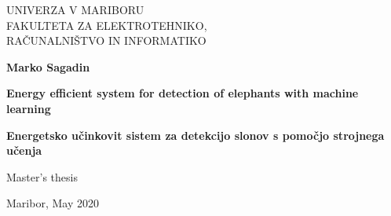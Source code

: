 \begin{titlepage}
    \begin{center}
 
        \fontsize{16}{26}
        \selectfont
        UNIVERZA V MARIBORU\\
        FAKULTETA ZA ELEKTROTEHNIKO,\\
        RAČUNALNIŠTVO IN INFORMATIKO
        \vspace*{3.0cm}

        \textbf{Marko Sagadin}

        \vspace{0.5cm}

        \fontsize{26}{26}
        \selectfont
        \textbf{Energy efficient system for detection of elephants with machine learning}
 
        \vspace{1.0cm}

        \fontsize{26}{26}
        \selectfont
        \textbf{Energetsko učinkovit sistem za detekcijo slonov s pomočjo strojnega učenja}

        \vspace{0.5cm}

        \fontsize{16}{18}
        \selectfont
        Master's thesis
 
        \vspace*{\fill}

        Maribor, May 2020 
 
 
    \end{center}
\end{titlepage}
